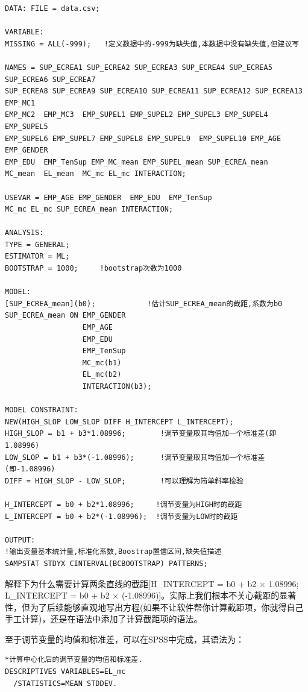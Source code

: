 \documentclass[
]{book}
\begin{document}
\begin{verbatim}
DATA: FILE = data.csv;

VARIABLE:
MISSING = ALL(-999);   !定义数据中的-999为缺失值,本数据中没有缺失值,但建议写

NAMES = SUP_ECREA1 SUP_ECREA2 SUP_ECREA3 SUP_ECREA4 SUP_ECREA5 SUP_ECREA6 SUP_ECREA7
SUP_ECREA8 SUP_ECREA9 SUP_ECREA10 SUP_ECREA11 SUP_ECREA12 SUP_ECREA13 EMP_MC1  
EMP_MC2  EMP_MC3  EMP_SUPEL1 EMP_SUPEL2 EMP_SUPEL3 EMP_SUPEL4  EMP_SUPEL5  
EMP_SUPEL6 EMP_SUPEL7 EMP_SUPEL8 EMP_SUPEL9  EMP_SUPEL10 EMP_AGE EMP_GENDER  
EMP_EDU  EMP_TenSup EMP_MC_mean EMP_SUPEL_mean SUP_ECREA_mean 
MC_mean  EL_mean  MC_mc EL_mc INTERACTION;

USEVAR = EMP_AGE EMP_GENDER  EMP_EDU  EMP_TenSup 
MC_mc EL_mc SUP_ECREA_mean INTERACTION;

ANALYSIS:
TYPE = GENERAL;
ESTIMATOR = ML;
BOOTSTRAP = 1000;     !bootstrap次数为1000

MODEL:
[SUP_ECREA_mean](b0);            !估计SUP_ECREA_mean的截距,系数为b0
SUP_ECREA_mean ON EMP_GENDER
                  EMP_AGE   
                  EMP_EDU  
                  EMP_TenSup 
                  MC_mc(b1)
                  EL_mc(b2)
                  INTERACTION(b3);

MODEL CONSTRAINT:
NEW(HIGH_SLOP LOW_SLOP DIFF H_INTERCEPT L_INTERCEPT);
HIGH_SLOP = b1 + b3*1.08996;        !调节变量取其均值加一个标准差(即1.08996)
LOW_SLOP = b1 + b3*(-1.08996);      !调节变量取其均值加一个标准差(即-1.08996)
DIFF = HIGH_SLOP - LOW_SLOP;        !可以理解为简单斜率检验

H_INTERCEPT = b0 + b2*1.08996;     !调节变量为HIGH时的截距
L_INTERCEPT = b0 + b2*(-1.08996);  !调节变量为LOW时的截距

OUTPUT:
!输出变量基本统计量,标准化系数,Boostrap置信区间,缺失值描述
SAMPSTAT STDYX CINTERVAL(BCBOOTSTRAP) PATTERNS;
\end{verbatim}

解释下为什么需要计算两条直线的截距{[}H\_INTERCEPT = b0 + b2 \(\times\) 1.08996; L\_INTERCEPT = b0 + b2 \(\times\) (-1.08996){]}。实际上我们根本不关心截距的显著性，但为了后续能够直观地写出方程(如果不让软件帮你计算截距项，你就得自己手工计算)，还是在语法中添加了计算截距项的语法。

至于调节变量的均值和标准差，可以在SPSS中完成，其语法为：

\begin{verbatim}
*计算中心化后的调节变量的均值和标准差.
DESCRIPTIVES VARIABLES=EL_mc
  /STATISTICS=MEAN STDDEV.
\end{verbatim}
\end{document}
